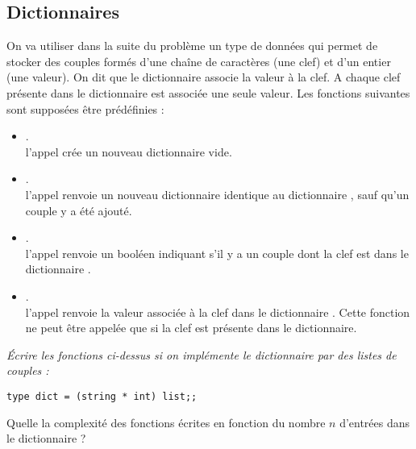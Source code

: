 \subsection{Dictionnaires}
On va utiliser dans la suite du problème un type de données  qui permet de stocker des couples formés d'une chaîne de caractères (une clef) et d'un entier (une valeur). On dit que le dictionnaire associe la valeur à la clef. A chaque clef présente dans le dictionnaire est associée une seule valeur. Les fonctions suivantes sont supposées être prédéfinies :
\begin{itemize}
\item {}.\\
l'appel  crée un nouveau dictionnaire vide.
\item {}.\\
l'appel  renvoie un nouveau dictionnaire identique au dictionnaire , sauf qu'un couple  y a été ajouté.
\item {}.\\
l'appel  renvoie un booléen indiquant s'il y a un couple dont la clef est  dans le dictionnaire . 
\item {}.\\
l'appel  renvoie la valeur associée à la clef  dans le dictionnaire . Cette fonction ne peut être appelée que si la clef est présente dans le dictionnaire.
\end{itemize}
\begin{Exercise}\it 
Écrire les fonctions ci-dessus si on implémente le dictionnaire par des listes de couples :
\begin{lstlisting}
type dict = (string * int) list;;
\end{lstlisting}
Quelle la complexité des fonctions écrites en fonction du nombre $n$ d'entrées dans le dictionnaire ?
\end{Exercise}
